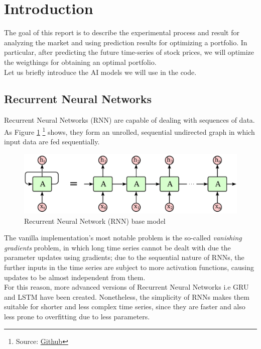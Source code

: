 \documentclass[12pt]{article}
\begin{document}


\section{Introduction}

The goal of this report is to describe the experimental process and result for analyzing the market and using prediction results for optimizing a portfolio. In particular, after predicting the future time-series of stock prices, we will optimize the weigthings for obtaining an optimal portfolio.\\
Let us briefly introduce the AI models we will use in the code.

\subsection{Recurrent Neural Networks}
\label{sec:rnn}
Recurrent Neural Networks (RNN) \cite{zaremba2014recurrent} are capable of dealing with sequences of data. As Figure \ref{fig:rnn} \footnote{Source: \href{https://kvitajakub.github.io/2016/04/14/rnn-diagrams/}{Github}}  shows, they form an unrolled, sequential undirected graph in which input data are fed sequentially.
\begin{figure}[h!]
    \centering
    \includegraphics[width=0.7\linewidth]{images/rnn.pdf}
    \caption{Recurrent Neural Network (RNN) base model}
    \label{fig:rnn}
\end{figure}
The vanilla implementation's most notable problem is the so-called \textit{vanishing gradients} problem, in which long time series cannot be dealt with due the parameter updates using gradients; due to the sequential nature of RNNs, the further inputs in the time series are subject to more activation functions, causing updates to be almost independent from them.\\
For this reason, more advanced versions of Recurrent Neural Networks i.e GRU and LSTM have been created. Nonetheless, the simplicity of RNNs makes them suitable for shorter and less complex time series, since they are faster and also less prone to overfitting due to less parameters.
\end{document}
